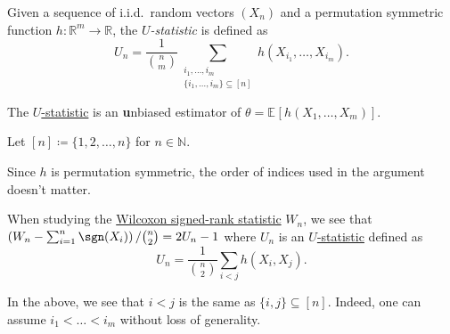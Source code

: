 \begin{definition}[\(U\)-statistic]\label{def:U-statistic}
	Given a sequence of i.i.d.\ random vectors \((X_n)\) and a permutation symmetric function \(h \colon \mathbb{R} ^m \to \mathbb{R} \), the \emph{\(U\)-statistic} is defined as
	\[
		U_n
		= \frac{1}{\binom{n}{m}} \sum_{\substack{i_1, \dots , i_m \\ \{ i_1, \dots , i_m \} \subseteq [n] }} h(X_{i_1}, \dots , X_{i_m}).
	\]
\end{definition}

\begin{remark}
	The \hyperref[def:U-statistic]{\(U\)-statistic} is an \textbf{u}nbiased estimator of \(\theta = \mathbb{E}_{}[h(X_1, \dots , X_m)] \).
\end{remark}

\begin{notation}
	Let \([n] \coloneqq \{ 1, 2, \dots , n \} \) for \(n \in \mathbb{N} \).
\end{notation}

\begin{note}
	Since \(h\) is permutation symmetric, the order of indices used in the argument doesn't matter.
\end{note}

\begin{eg}
	When studying the \hyperref[def:Wilcoxon-signed-rank-statistic]{Wilcoxon signed-rank statistic} \(W_n\), we see that \(\left( W_n - \sum_{i=1}^{n} \sgn (X_i) \right) / \binom{n}{2} = 2U_n - 1\) where \(U_n\) is an \hyperref[def:U-statistic]{\(U\)-statistic} defined as
	\[
		U_n = \frac{1}{\binom{n}{2}} \sum_{i < j} h(X_i, X_j).
	\]
\end{eg}

\begin{note}
	In the above, we see that \(i < j\) is the same as \(\{ i, j \} \subseteq [n] \). Indeed, one can assume \(i_1 < \dots < i_m\) without loss of generality.
\end{note}


